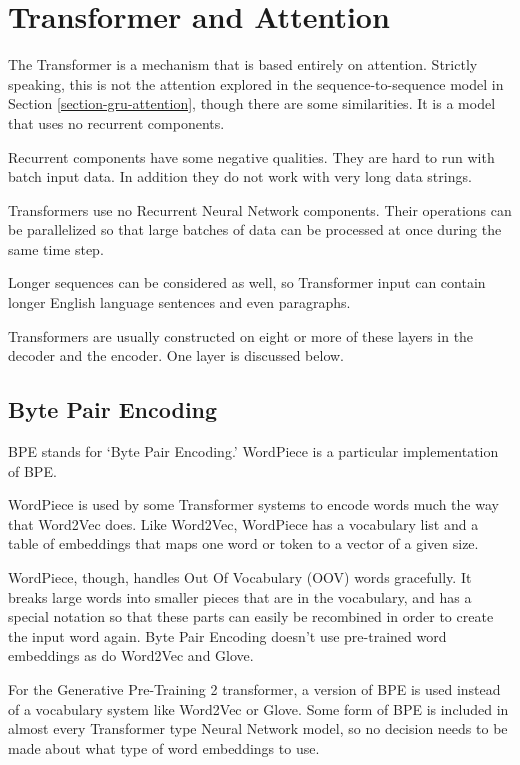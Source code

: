 
\section{Transformer and Attention}

\label{transformer-intro}

The Transformer is a mechanism that is based entirely on attention. Strictly speaking, this is not the attention explored in the sequence-to-sequence model in Section \ref{section-gru-attention}, though there are some similarities. It is a model that uses no recurrent components.

Recurrent components have some negative qualities. They are hard to run with batch input data. In addition they do not work with very long data strings. 


Transformers use no Recurrent Neural Network components. Their operations can be parallelized so that large batches of data can be processed at once during the same time step. 

Longer sequences can be considered as well, so Transformer input can contain longer English language sentences and even paragraphs. 

Transformers are usually constructed on eight or more of these layers in the decoder and the encoder. One layer is discussed below.

\subsection{Byte Pair Encoding}

\ac{BPE} stands for `Byte Pair Encoding.' WordPiece is a particular implementation of BPE.

WordPiece is used by some Transformer systems to encode words much the way that Word2Vec does. Like Word2Vec, WordPiece  has a vocabulary list and a table of embeddings that maps one word or token to a vector of a given size.

WordPiece, though, handles Out Of Vocabulary (\ac{OOV}) words gracefully. It breaks large words into smaller pieces that are in the vocabulary, and has a special notation so that these parts can easily be recombined in order to create the input word again. Byte Pair Encoding doesn't use pre-trained word embeddings as do Word2Vec and Glove.

For the Generative Pre-Training 2 transformer, a version of BPE is used instead of a vocabulary system like Word2Vec or Glove. Some form of BPE is included in almost every Transformer type Neural Network model, so no decision needs to be made about what type of word embeddings to use.

